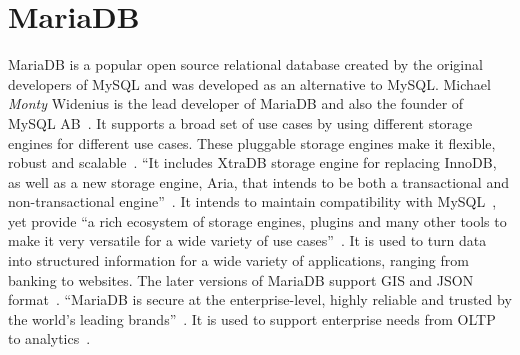 \section{MariaDB}

MariaDB is a popular open source relational database created by the
original developers of MySQL and was developed as an alternative to
MySQL. Michael \textit{Monty} Widenius is the lead developer of MariaDB and
also the founder of MySQL AB~\cite{hid-sp18-516-wiki-mariadb}. It
supports a broad set of use cases by using different storage engines
for different use cases. These pluggable storage engines make it
flexible, robust and scalable~\cite{hid-sp18-516-mariadb-server}. ``It
includes XtraDB storage engine for replacing InnoDB, as well as a new
storage engine, Aria, that intends to be both a transactional and
non-transactional engine''~\cite{hid-sp18-516-wiki-mariadb}. It
intends to maintain compatibility with
MySQL~\cite{hid-sp18-516-wiki-mariadb}, yet provide ``a rich ecosystem
of storage engines, plugins and many other tools to make it very
versatile for a wide variety of use
cases''~\cite{hid-sp18-516-mariadb-foundation}. It is used to turn
data into structured information for a wide variety of applications,
ranging from banking to websites. The later versions of MariaDB
support GIS and JSON
format~\cite{hid-sp18-516-mariadb-foundation}. ``MariaDB is secure at
the enterprise-level, highly reliable and trusted by the world's
leading brands''~\cite{hid-sp18-516-mariadb}. It is used to support
enterprise needs from OLTP to analytics~\cite{hid-sp18-516-mariadb}.